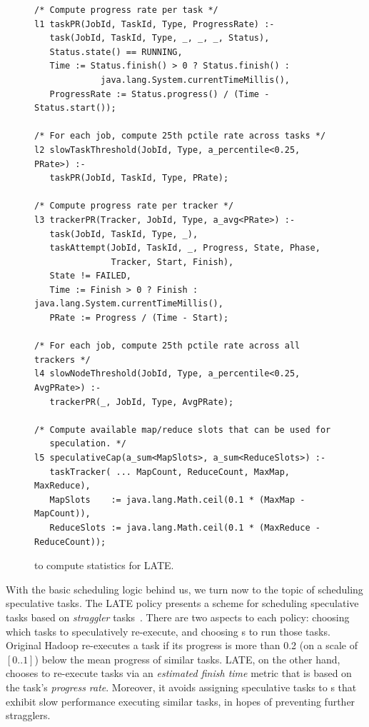 \begin{figure}[p]
\ssp
\begin{lstlisting}
/* Compute progress rate per task */
l1 taskPR(JobId, TaskId, Type, ProgressRate) :-
   task(JobId, TaskId, Type, _, _, _, Status),
   Status.state() == RUNNING,
   Time := Status.finish() > 0 ? Status.finish() : 
             java.lang.System.currentTimeMillis(),
   ProgressRate := Status.progress() / (Time - Status.start());

/* For each job, compute 25th pctile rate across tasks */
l2 slowTaskThreshold(JobId, Type, a_percentile<0.25, PRate>) :-
   taskPR(JobId, TaskId, Type, PRate);

/* Compute progress rate per tracker */
l3 trackerPR(Tracker, JobId, Type, a_avg<PRate>) :- 
   task(JobId, TaskId, Type, _),
   taskAttempt(JobId, TaskId, _, Progress, State, Phase, 
               Tracker, Start, Finish),
   State != FAILED,
   Time := Finish > 0 ? Finish : java.lang.System.currentTimeMillis(),
   PRate := Progress / (Time - Start);

/* For each job, compute 25th pctile rate across all trackers */
l4 slowNodeThreshold(JobId, Type, a_percentile<0.25, AvgPRate>) :-
   trackerPR(_, JobId, Type, AvgPRate);

/* Compute available map/reduce slots that can be used for 
   speculation. */
l5 speculativeCap(a_sum<MapSlots>, a_sum<ReduceSlots>) :-
   taskTracker( ... MapCount, ReduceCount, MaxMap, MaxReduce),
   MapSlots    := java.lang.Math.ceil(0.1 * (MaxMap - MapCount)),
   ReduceSlots := java.lang.Math.ceil(0.1 * (MaxReduce - ReduceCount));
\end{lstlisting}
\caption{\OVERLOG to compute statistics for LATE.}
\label{fig:latePolicy}
\end{figure}

With the basic scheduling logic behind us, we turn now to the topic of
scheduling speculative tasks.  The LATE policy presents a scheme for scheduling
speculative tasks based on {\em straggler} tasks~\cite{zaharia-late}.  There
are two aspects to each policy: choosing which tasks to speculatively
re-execute, and choosing {\TT}s to run those tasks.  Original Hadoop
re-executes a task if its progress is more than 0.2 (on a scale of $[0..1]$)
below the mean progress of similar tasks.  LATE, on the other hand, chooses to
re-execute tasks via an {\em estimated finish time} metric that is based on the
task's {\em progress rate}.  Moreover, it avoids assigning speculative tasks to
{\TT}s that exhibit slow performance executing similar tasks, in hopes of
preventing further stragglers.

